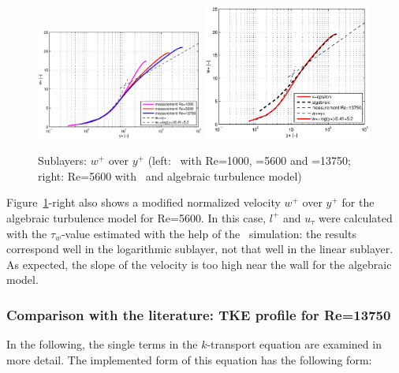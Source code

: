 \begin{figure}[!htb]
\centering
\includegraphics[trim=35 0 30 0,clip,width=0.49\textwidth]{FIGURES/wplusyplus.eps}
\includegraphics[trim=35 0 30 0,clip,width=0.49\textwidth]{FIGURES/avske.eps}
\caption{Sublayers: $w^+$ over $y^+$ (left: \ke\, with Re=1000, =5600 and =13750; right: Re=5600 with \ke\, and algebraic turbulence model)}
\label{fig:sublayers_y+}
\end{figure} 

\noindent Figure~\ref{fig:sublayers_y+}-right also shows a modified normalized velocity $w^+$ over $y^+$ for the algebraic turbulence model for Re=5600. In this case, $l^+$ and $u_{\tau}$ were calculated with the $\tau_w$-value estimated with the help of the \ke\, simulation: the results correspond well in the logarithmic sublayer, not that well in the linear sublayer. As expected, the slope of the velocity is too high near the wall for the algebraic model.


\subsubsection*{Comparison with the literature: TKE profile for Re=13750}

In the following, the single terms in the $k$-transport equation are examined in more detail. The implemented form of this equation has the following form:

